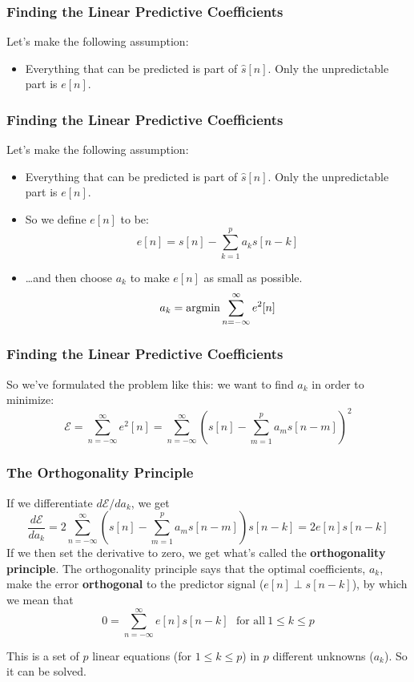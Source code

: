 \documentclass{beamer}
\newcommand{\argmin}{\operatornamewithlimits{argmin}}
\begin{document}
\begin{frame}
  \frametitle{Finding the Linear Predictive Coefficients}

  Let's make the following assumption:
  \begin{itemize}
  \item Everything that can be predicted is part of $\hat{s}[n]$.
    Only the unpredictable part is $e[n]$.
  \end{itemize}
\end{frame}
  
\begin{frame}
  \frametitle{Finding the Linear Predictive Coefficients}

  Let's make the following assumption:
  \begin{itemize}
  \item Everything that can be predicted is part of $\hat{s}[n]$.
    Only the unpredictable part is $e[n]$.
  \item So we define $e[n]$ to be:
    \begin{displaymath}
      e[n] = s[n] -\sum_{k=1}^p a_k s[n-k]
    \end{displaymath}
  \item \ldots and then choose $a_k$ to make $e[n]$ as small as possible.
    \begin{displaymath}
      a_k = \argmin \sum_{n=-\infty}^\infty e^2[n]
    \end{displaymath}
  \end{itemize}
\end{frame}
  
\begin{frame}
  \frametitle{Finding the Linear Predictive Coefficients}

  So we've formulated the problem like this: we want to find $a_k$ in
  order to minimize:
  \begin{displaymath}
    {\mathcal E}=\sum_{n=-\infty}^\infty e^2[n] =
    \sum_{n=-\infty}^\infty\left(s[n]-\sum_{m=1}^p a_m s[n-m]\right)^2
  \end{displaymath}
\end{frame}
\begin{frame}
  \frametitle{The Orthogonality Principle}
  
  If we differentiate $d{\mathcal E}/da_k$, we get
  \begin{displaymath}
    \frac{d{\mathcal E}}{da_k} =
    2\sum_{n=-\infty}^\infty \left(s[n]-\sum_{m=1}^pa_m s[n-m]\right)s[n-k]=2e[n]s[n-k]
  \end{displaymath}
  If we then set the derivative to zero, we get what's called the {\bf orthogonality principle}.
  The orthogonality principle says that the optimal coefficients, $a_k$, make
  the error {\bf orthogonal} to the predictor signal ($e[n]\perp s[n-k]$), by which we mean that
  \begin{displaymath}
    0 = \sum_{n=-\infty}^{\infty}e[n]s[n-k]~~~\mbox{for all}~1\le k\le p
  \end{displaymath}

  This is a set of $p$ linear equations (for $1\le k\le p$) in $p$
  different unknowns ($a_k$).  So it can be solved.
\end{frame}
\end{document}
